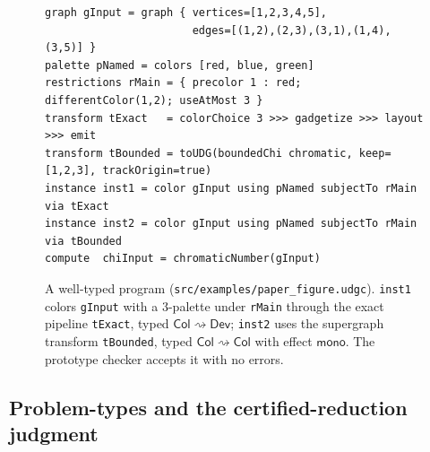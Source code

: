 \documentclass[a4paper,fleqn]{cas-sc}
\newcommand{\tCol}{\mathsf{Col}}
\newcommand{\tDev}{\mathsf{Dev}}
\newcommand{\monoeff}{\textsf{mono}}
\begin{document}
\begin{figure}[tb]
\small
\begin{lstlisting}[basicstyle=\ttfamily\scriptsize]
graph gInput = graph { vertices=[1,2,3,4,5],
                       edges=[(1,2),(2,3),(3,1),(1,4),(3,5)] }
palette pNamed = colors [red, blue, green]
restrictions rMain = { precolor 1 : red; differentColor(1,2); useAtMost 3 }
transform tExact   = colorChoice 3 >>> gadgetize >>> layout >>> emit
transform tBounded = toUDG(boundedChi chromatic, keep=[1,2,3], trackOrigin=true)
instance inst1 = color gInput using pNamed subjectTo rMain via tExact
instance inst2 = color gInput using pNamed subjectTo rMain via tBounded
compute  chiInput = chromaticNumber(gInput)
\end{lstlisting}
\caption{A well-typed program (\texttt{src/examples/paper\_figure.udgc}).
\texttt{inst1} colors \texttt{gInput} with a $3$-palette under \texttt{rMain} through
the exact pipeline \texttt{tExact}, typed $\tCol\rightsquigarrow\tDev$; \texttt{inst2}
uses the supergraph transform \texttt{tBounded}, typed $\tCol\rightsquigarrow\tCol$
with effect $\monoeff$. The prototype checker accepts it with no errors.}
\label{fig:program}
\end{figure}

\subsection{Problem-types and the certified-reduction judgment}
\label{sec:sorts}
\end{document}
